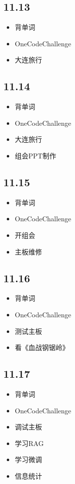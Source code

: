 \documentclass[UTF8]{ctexart}
\begin{document}
\subsection*{11.13}
\begin{itemize}
    \item 背单词
    \item OneCodeChallenge
    \item 大连旅行
\end{itemize}

\subsection*{11.14}
\begin{itemize}
    \item 背单词
    \item OneCodeChallenge
    \item 大连旅行
    \item 组会PPT制作
\end{itemize}

\subsection*{11.15}
\begin{itemize}
    \item 背单词
    \item OneCodeChallenge
    \item 开组会
    \item 主板维修
\end{itemize}

\subsection*{11.16}
\begin{itemize}
    \item 背单词
    \item OneCodeChallenge
    \item 测试主板
    \item 看《血战钢锯岭》
\end{itemize}

\subsection*{11.17}
\begin{itemize}
    \item 背单词
    \item OneCodeChallenge
    \item 调试主板
    \item 学习RAG
    \item 学习微调
    \item 信息统计
\end{itemize}
\end{document}
